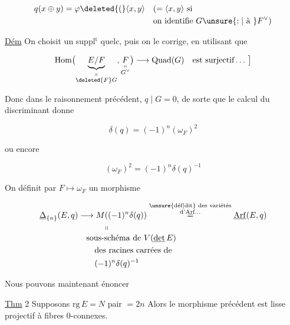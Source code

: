 \[
\begin{aligned}
q(x\oplus y)&=\varphi\deleted{(}\langle x,y\rangle &&(=\langle x,y\rangle\ \text{si}\\
&&&\text{on identifie }G\unsure{:|\text{ à }}F^\vee)
\end{aligned}
\]

\uline{Dém} On choisit un suppl$^{\mathrm t}$ quelc, puis on le corrige, en utilisant que

\[
\mathrm{Hom}\bigl(\underbrace{E/F}_{\substack{\shortparallel\\ \deleted{F}G}},\underset{\substack{\shortparallel\\G^\vee}}{F}\bigr)
\longrightarrow\mathrm{Quad}(G)\quad\text{est surjectif}\ldots\ \bigr]
\]

Donc dans le raisonnement précédent,  $q\mid G=0$, de sorte que le calcul du discriminant donne

\[
\delta(q)=(-1)^n(\omega_F)^2
\]

ou encore

\[
\boxed{(\omega_F)^2=(-1)^n\delta(q)^{-1}}
\]


On définit par $F\longmapsto\omega_F$ un morphisme

\[
\begin{aligned}
\underline{\Delta}_{\{n\}}(E,q)&\longrightarrow
M((-1)^n\delta(q))\overset{\substack{\text{\unsure{déf|dit} des variétés}\\\text{d'Arf}\ldots}}{=}\underline{\mathrm{Arf}}(E,q)\\[-2pt]
&\hspace{3em}\shortparallel\\[-2pt]
&\quad\text{sous-schéma de }V(\underline{\det}\,E)\\
&\qquad\text{des racines carrées de}\\
&\qquad (-1)^n\delta(q)^{-1}
\end{aligned}
\]


Nous pouvons maintenant énoncer

\uline{Thm} 2 Supposons $\mathrm{rg}\,E=N$ pair $=2n$  Alors le morphisme précédent est lisse projectif à fibres  $0$-connexes.

